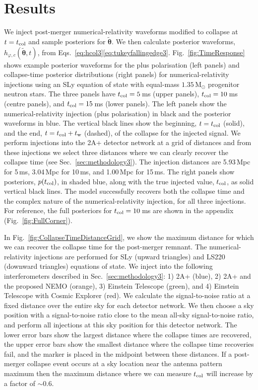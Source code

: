 \documentclass[../Thesis.tex]{subfiles}
\begin{document}
\section{Results}\label{sec:results3}
    We inject post-merger numerical-relativity waveforms modified to collapse at $t=t_{\mathrm{col}}$ and sample posteriors for $\boldsymbol{\tilde{\theta}}$.
    We then calculate posterior waveforms, $h_{\varphi,c}(\boldsymbol{\tilde{\theta}},t)$, from Eqs.~\ref{eq:hcol3}\Hyphdash*\ref{eq:tukeyfallingedge3}.
    Fig.~\ref{fig:TimeResponse} shows example posterior waveforms for the plus polarisation (left panels) and collapse-time posterior distributions (right panels) for numerical-relativity injections using an SLy equation of state with equal-mass $1.35\,\mathrm{M}_\odot$ progenitor neutron stars.
    The three panels have $t_{\mathrm{col}}=5$\,ms (upper panels), $t_{\mathrm{col}}=10$\,ms (centre panels), and $t_{\mathrm{col}}=15$\,ms (lower panels).
    The left panels show the numerical-relativity injection (plus polarisation) in black and the posterior waveforms in blue.
    The vertical black lines show the beginning, $t=t_{\mathrm{col}}$ (solid), and the end, $t=t_{\mathrm{col}}+t_{\mathrm{w}}$ (dashed), of the collapse for the injected signal.
    We perform injections into the 2A+ detector network at a grid of distances  and from these injections we select three distances where we can clearly recover the collapse time (see Sec.~\ref{sec:methodology3}).
    The injection distances are 5.93\,Mpc for 5\,ms, 3.04\,Mpc for 10\,ms, and 1.00\,Mpc for 15\,ms.
    The right panels show posteriors, $p(t_{\mathrm{col}})$, in shaded blue, along with the true injected value, $t_{\mathrm{col}}$, as solid vertical black lines.
    The model successfully recovers both the collapse time and the complex nature of the numerical-relativity injection, for all three injections.
    For reference, the full posteriors for $t_{\mathrm{col}}=10\,$ms are shown in the appendix (Fig.~\ref{fig:FullCorner}).\par

\par
    In Fig.~\ref{fig:CollapseTimeDistanceGrid}, we show the maximum distance for which we can recover the collapse time for the post-merger remnant.
    The numerical-relativity injections are performed for SLy (upward triangles) and LS220 (downward triangles) equations of state.
    We inject into the following interferometers described in Sec.~\ref{sec:methodology3}: 1) 2A+ (blue), 2) 2A+ and the proposed NEMO (orange), 3) Einstein Telescope (green), and 4) Einstein Telescope with Cosmic Explorer (red).
    We calculate the signal-to-noise ratio at a fixed distance over the entire sky for each detector network.
    We then choose a sky position with a signal-to-noise ratio close to the mean all-sky signal-to-noise ratio, and perform all injections at this sky position for this detector network.
    The lower error bars show the largest distance where the collapse times are recovered, the upper error bars show the smallest distance where the collapse time recoveries fail, and the marker is placed in the midpoint between these distances.
    If a post-merger collapse event occurs at a sky location near the antenna pattern maximum then the maximum distance where we can measure $t_{\mathrm{col}}$ will increase by a factor of $\sim\!0.6$.
    \par
    
\end{document}
